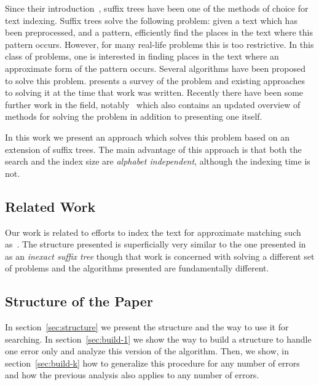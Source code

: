Since their introduction~\cite{DBLP:conf/focs/Weiner73}, suffix trees have been one of the methods of choice for text indexing. Suffix trees solve the following problem: given a text which has been preprocessed, and a pattern, efficiently find the places in the text where this pattern occurs.  However, for many real-life problems this is too restrictive. In this class of problems, one is interested in finding places in the text where an approximate form of the pattern occurs. Several algorithms have been proposed to solve this problem. \cite{navarro:guided} presents a survey of the problem and existing approaches to solving it at the time that work was written. Recently there have been some further work in the field, notably~\cite{maass:text} which also contains an updated overview of methods for solving the problem in addition to presenting one itself.

In this work we present an approach which solves this problem based on an extension of suffix trees. The main advantage of this approach is that both the search and the index size are \emph{alphabet independent}, although the indexing time is not.

\subsection{Related Work}

Our work is related to efforts to index the text for approximate matching such as~\cite{maass:text,amir00oneerror}. The structure presented is superficially very similar to the one presented in~\cite{DBLP:journals/tcs/ChattarajP05} as an \textit{inexact suffix tree} though that work is concerned with solving a different set of problems and the algorithms presented are fundamentally different.

\subsection{Structure of the Paper}

In section~\ref{sec:structure} we present the structure and the way to use it for searching. In section~\ref{sec:build-1} we show the way to build a structure to handle one error only and analyze this version of the algorithm. Then, we show, in section~\ref{sec:build-k} how to generalize this procedure for any number of errors and how the previous analysis also applies to any number of errors.


